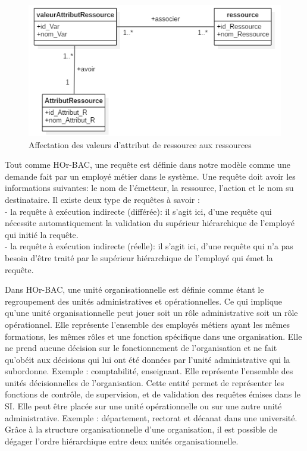 \begin{figure}[h!]
    \centering
		\includegraphics[scale=0.7]{chap3/images/ressource_attribut.png}
    \caption{Affectation des valeurs d'attribut de ressource aux ressources}
	 \label{figressource}
\end{figure} 

\label{sectionRequête}

Tout comme HOr-BAC, une requête est définie dans notre modèle comme une demande fait par un employé métier dans  le système. Une requête doit avoir les informations suivantes: le nom de l'émetteur, la ressource, l'action et le nom su destinataire. Il existe deux type de requêtes à savoir :\\
- la requête à exécution indirecte (différée): il s'agit ici, d'une requête qui nécessite automatiquement la validation du supérieur hiérarchique de l'employé qui initié la requête.\\
- la requête à exécution indirecte (réelle): il s'agit ici, d'une requête qui n'a pas besoin d'être traité par le supérieur hiérarchique de l'employé qui émet la requête. 

\label{sectionUnitéOrg}

Dans HOr-BAC, une unité organisationnelle est définie comme étant le regroupement des unités administratives et opérationnelles. Ce qui implique qu'une unité organisationnelle peut jouer soit un rôle administrative soit un rôle opérationnel.
\label{sectionUnitéOpérationnelle}
Elle représente l'ensemble des employés métiers ayant les mêmes formations, les mêmes rôles et une fonction spécifique dans une organisation. Elle ne prend aucune décision sur le fonctionnement de l'organisation et ne fait qu'obéit aux décisions qui lui ont été données par l'unité administrative qui la subordonne. Exemple : comptabilité, enseignant. 
\label{sectionUnitéAdministrative}
Elle représente l'ensemble des unités décisionnelles de l'organisation. Cette entité permet de représenter les fonctions de contrôle, de supervision, et de validation des requêtes émises dans le SI. Elle peut être placée sur une unité opérationnelle ou sur une autre unité administrative. Exemple : département, rectorat et décanat dans une université.\\
\hspace*{0.5cm} Grâce à la structure organisationnelle d'une organisation, il est possible de dégager l'ordre hiérarchique entre deux unités organisationnelle.

